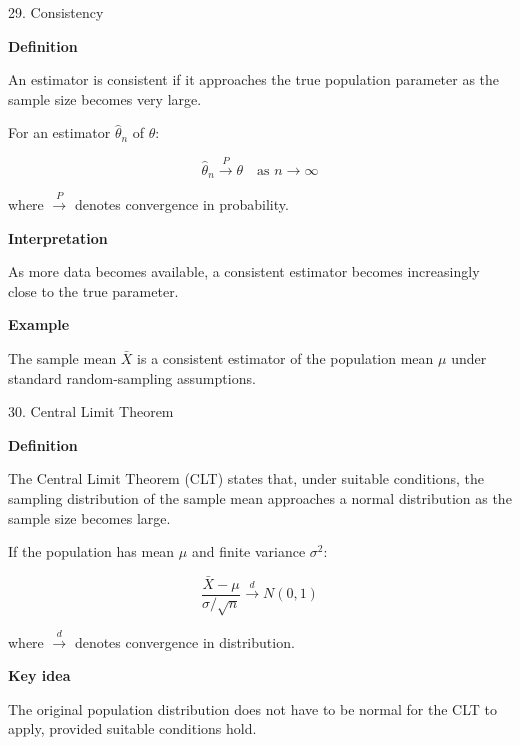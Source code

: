
\begin{frame}{29. Consistency}

\textbf{Definition}

An estimator is consistent if it approaches the true population
parameter as the sample size becomes very large.

For an estimator $\hat{\theta}_n$ of $\theta$:

\[
\boxed{
\hat{\theta}_n
\xrightarrow{P}
\theta
\quad\text{as } n\rightarrow\infty
}
\]

where $\xrightarrow{P}$ denotes convergence in probability.

\textbf{Interpretation}

As more data becomes available, a consistent estimator becomes
increasingly close to the true parameter.

\textbf{Example}

The sample mean $\bar{X}$ is a consistent estimator of the
population mean $\mu$ under standard random-sampling assumptions.

\end{frame}



\begin{frame}{30. Central Limit Theorem}

\textbf{Definition}

The Central Limit Theorem (CLT) states that, under suitable
conditions, the sampling distribution of the sample mean
approaches a normal distribution as the sample size becomes large.

\vspace{0.4cm}

If the population has mean $\mu$ and finite variance $\sigma^2$:

\[
\boxed{
\frac{\bar{X}-\mu}
{\sigma/\sqrt{n}}
\xrightarrow{d}
N(0,1)
}
\]

where $\xrightarrow{d}$ denotes convergence in distribution.

\vspace{0.3cm}

\textbf{Key idea}

The original population distribution does not have to be
normal for the CLT to apply, provided suitable conditions hold.

\end{frame}

